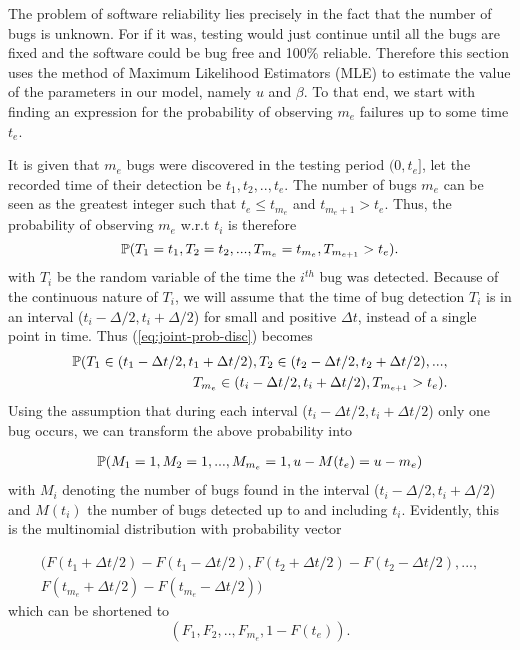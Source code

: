 The problem of software reliability lies precisely in the fact that the number of bugs is unknown. For if it was, testing would just continue until all the bugs are fixed and the software could be bug free and 100\% reliable. Therefore this section uses the method of Maximum Likelihood Estimators (MLE) to estimate the value of the parameters in our model, namely $u$ and $\beta$. To that end, we start with finding an expression for the probability of observing $m_e$ failures up to some time $t_e$.

It is given that $m_e$ bugs were discovered in the testing period $(0, t_e]$, let the recorded time of their detection be $t_1,t_2,..,t_e$. The number of bugs $m_e$ can be seen as the greatest integer such that $t_e \leq t_{m_e}$ and $t_{m_{e}+1} > t_e$. Thus, the probability of observing $m_e$ w.r.t $t_i$ is therefore 
\begin{equation}\label{eq:joint-prob-disc}
    \mathbb{P}(T_1 = t_1, T_2 = t_2 ,...,T_{m_e}=t_{m_e}, T_{m_{e+1}} > t_e).
\end{equation}
with $T_i$ be the random variable of the time the $i^{th}$ bug was detected. 
Because of the continuous nature of $T_i$, we will assume that the time of bug detection $T_i$ is in an interval ($t_i -\Delta/2, t_i + \Delta/2$) for small and positive $\Delta t$, instead of a single point in time. Thus (\ref{eq:joint-prob-disc}) becomes 
\begin{align*}
    \mathbb{P}(T_1 \in (t_1 -\Delta t/2, t_1 + \Delta t/2) , T_2 \in (t_2 -\Delta t/2, t_2 + \Delta t/2) ,...,\\T_{m_e} \in (t_i -\Delta t/2, t_i + \Delta t/2),
    T_{m_{e+1}} > t_e).
\end{align*}
Using the assumption that during each interval ($t_i -\Delta t/2, t_i + \Delta t/2$) only one bug occurs, we can transform the above probability into 

\begin{align*}
        \mathbb{P}(M_1 = 1 , M_2 = 1 ,...,M_{m_e} = 1, u - M(t_e) = u - m_e)
\end{align*}
with $M_i$ denoting the number of bugs found in the interval ($t_i -\Delta/2, t_i + \Delta/2$) and $M(t_i)$ the number of bugs detected up to and including $t_i$. Evidently, this is the multinomial distribution with probability vector

\begin{align*}
(F(t_1 + \Delta t/2) - F(t_1 - \Delta t/2), F(t_2 + \Delta t/2) - F(t_2 - \Delta t/2),...,\\F(t_{m_e} + \Delta t/2) - F(t_{m_e} - \Delta t/2))
\end{align*}
which can be shortened to 
$$
(F_1, F_2,..,F_{m_e}, 1 - F(t_e)). 
$$

